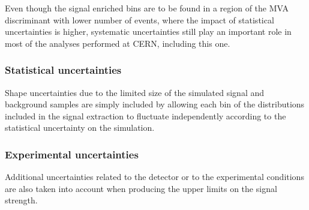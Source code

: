 \documentclass[a4paper, 10pt, openright]{report}
\begin{document}
Even though the signal enriched bins are to be found in a region of the \ac{MVA} discriminant with lower number of events, where the impact of statistical uncertainties is higher, systematic uncertainties still play an important role in most of the analyses performed at \ac{CERN}, including this one.

\subsubsection{Statistical uncertainties}

Shape uncertainties due to the limited size of the simulated signal and background samples are simply included by allowing each bin of the distributions included in the signal extraction to fluctuate independently according to the statistical uncertainty on the simulation.

\subsubsection{Experimental uncertainties}

Additional uncertainties related to the detector or to the experimental conditions are also taken into account when producing the upper limits on the signal strength.
\end{document}
